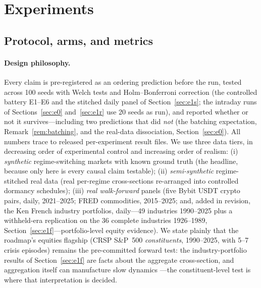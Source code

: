 \documentclass{article}
\begin{document}
\section{Experiments}
\label{sec:experiments}

\subsection{Protocol, arms, and metrics}
\label{sec:protocol}

\paragraph{Design philosophy.} Every claim is pre-registered as an ordering
prediction before the run, tested across 100 seeds with Welch tests and
Holm--Bonferroni correction (the controlled battery E1--E6 and the stitched
daily panel of Section~\ref{sec:e1s}; the intraday runs of
Sections~\ref{sec:e0} and~\ref{sec:e1r} use 20 seeds as run), and reported
whether or not it survives---including
two predictions that did \emph{not} (the batching expectation,
Remark~\ref{rem:batching}, and the real-data dissociation,
Section~\ref{sec:e0}). All numbers trace to released per-experiment result
files. We use three data tiers, in decreasing order of experimental control
and increasing order of realism: (i) \emph{synthetic} regime-switching
markets with known ground truth (the headline, because only here is every
causal claim testable); (ii) \emph{semi-synthetic} regime-stitched real
data (real per-regime cross-sections re-arranged into controlled dormancy
schedules); (iii) \emph{real walk-forward} panels (five Bybit USDT crypto
pairs, daily, 2021--2025; FRED commodities, 2015--2025; and, added in
revision, the Ken French industry portfolios, daily---49 industries
1990--2025 plus a withheld-era replication on the 36 complete
industries 1926--1989, Section~\ref{sec:e1f}---portfolio-level equity
evidence). We state
plainly that the roadmap's equities flagship (CRSP S\&P~500
\emph{constituents}, 1990--2025, with 5--7 crisis episodes) remains the
pre-committed forward test: the industry-portfolio results of
Section~\ref{sec:e1f} are facts about the aggregate cross-section, and
aggregation itself can manufacture slow dynamics
\citep{lo1988stock}---the constituent-level test is where that
interpretation is decided.
\end{document}
